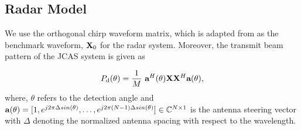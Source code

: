 \documentclass[conference]{IEEEtran}
\begin{document}
\subsection{Radar Model}%

We use the orthogonal chirp waveform matrix, which is adapted from \cite{7450660} as the benchmark waveform, ${\mathbf{X}}_0$ for the radar system. Moreover, the transmit beam pattern of the JCAS system is given as%




\begin{equation}
P_\textrm{d}(\theta) = \frac{1}{M}\ \textbf{a}^{H}(\theta)\mX\mX^{H}\textbf{a}(\theta), \label{eq:5}
\end{equation}
where, $\theta$ refers to the detection angle and $ \textbf{a}(\theta) = [1, e^{j2\pi\Delta sin(\theta)}, \ldots, e^{j2\pi(N-1)\Delta sin(\theta)}] \in \mathbb{C}^{N \times 1} $ is the antenna steering vector with $\Delta$ denoting the normalized antenna spacing with respect to the wavelength.
\end{document}
